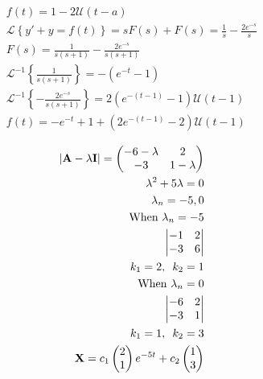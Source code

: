 \documentclass[12pt]{article}
\begin{document}
\begin{equation}
  \begin{split}
    f(t)=1-2\mathcal{U}\left( t-a \right)\\
    \mathcal{L}\left\{ y'+y=f(t) \right\}=sF(s)+F(s)=\frac{1}{s}-\frac{2e^{-s}}{s}\\
    F(s)=\frac{1}{s(s+1)}-\frac{2e^{-s}}{s(s+1)}\\
    \mathcal{L}^{-1}\left\{  \frac{1}{s(s+1)}\right\}=-(e^{-t}-1)\\
    \mathcal{L}^{-1}\left\{  -\frac{2e^{-s}}{s(s+1)}\right\}=2(e^{-(t-1)}-1)\mathcal{U}(t-1)\\
  f(t)=-e^{-t}+1+(2e^{-(t-1)}-2)\mathcal{U}(t-1)
  \end{split}
  \label{8}
\end{equation}


\hline
\begin{equation}
  \begin{split}
    |\bold{A}-\lambda\bold{I}|=\begin{pmatrix} -6-\lambda & 2 \\ -3 & 1-\lambda \\ \end{pmatrix}\\
    \lambda^2+5\lambda=0\\
    \lambda_n=-5,0\\
    \text{When }\lambda_n=-5\\
    \begin{vmatrix} -1 & 2 \\ -3 & 6 \\ \end{vmatrix}\\
    k_1=2,\,\,\,k_2=1\\
    \text{When }\lambda_n=0\\
    \begin{vmatrix} -6 & 2 \\ -3 & 1 \\ \end{vmatrix}\\
    k_1=1,\,\,\,k_2=3\\
    \bold{X}=c_1\begin{pmatrix} 2 \\ 1 \end{pmatrix}e^{-5t}+c_2\begin{pmatrix} 1 \\ 3 \end{pmatrix}
  \end{split}
  \label{9}
\end{equation}
\end{document}
